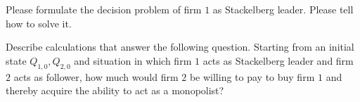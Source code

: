 \medskip
{} Please formulate the decision problem of firm $1$ as Stackelberg leader.  Please tell how to solve it.
%


\medskip
{}  Describe calculations that answer the following question.  Starting from an initial state $Q_{1,0}, Q_{2,0}$ and situation in which
firm $1$ acts as Stackelberg leader and firm $2$ acts as follower, how much would firm $2$ be willing to pay to buy  firm $1$ and thereby acquire the ability to act as
a monopolist?


\bye






\bye
